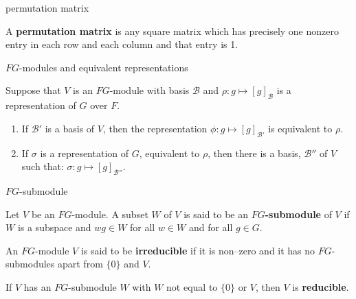 \documentclass[avery5371,grid]{flashcards}
\newcommand{\B}{\mathscr{B}}
\newcommand{\defn}[1]{\textbf{#1}}
\begin{document}
\begin{flashcard}[Definition]{permutation matrix}

  A \defn{permutation matrix} is any square matrix which has precisely
  one nonzero entry in each row and each column and that entry is 1.

\end{flashcard}

\begin{flashcard}[Theorem 4.12]{$FG$-modules and equivalent representations}

  Suppose that $V$ is an $FG$-module with basis $\B$ and
  $\rho : g \mapsto [g]_{\B}$ is a representation of $G$ over $F$.
  \begin{enumerate}
  \item If $\B'$ is a basis of $V$, then the representation
    $\phi : g \mapsto [g]_{\B'}$ is equivalent to $\rho$.
  \item If $\sigma$ is a representation of $G$, equivalent to $\rho$,
    then there is a basis, $\B''$ of $V$ such that:
    $\sigma : g \mapsto [g]_{\B''}$.
  \end{enumerate}

\end{flashcard}

\begin{flashcard}[Definition]{$FG$-submodule}

  Let $V$ be an $FG$-module. A subset $W$ of $V$ is said to be an
  \defn{$FG$-submodule} of $V$ if $W$ is a subspace and $wg \in W$ for
  all $w\in W$ and for all $g\in G$.

\end{flashcard}

\begin{flashcard}{}

  An $FG$-module $V$ is said to be \defn{irreducible} if it is
  non--zero and it has no $FG$-submodules apart from $\{0\}$ and $V$.

  \bigskip

  If $V$ has an $FG$-submodule $W$ with $W$ not equal to $\{0\}$ or
  $V$, then $V$ is \defn{reducible}.

\end{flashcard}
\end{document}
